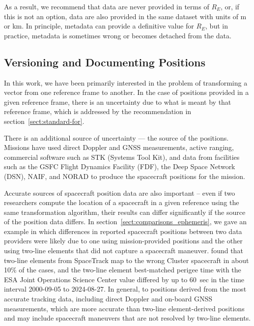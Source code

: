 \documentclass[draft]{agujournal2019}
\begin{document}
As a result, we recommend that data are never provided in terms of $R_E$, or, if this is not an option, data are also provided in the same dataset with units of m or km. In principle, metadata can provide a definitive value for $R_E$, but in practice, metadata is sometimes wrong or becomes detached from the data.

\subsection{Versioning and Documenting Positions}
\label{sect:ephemeris-version}

In this work, we have been primarily interested in the problem of transforming a vector from one reference frame to another. In the case of positions provided in a given reference frame, there is an uncertainty due to what is meant by that reference frame, which is addressed by the recommendation in section~\ref{sect:standard-for}. 

There is an additional source of uncertainty --- the source of the positions. Missions have used direct Doppler and GNSS measurements, active ranging, commercial software such as STK (Systems Tool Kit), and data from facilities such as the GSFC Flight Dynamics Facility (FDF), the Deep Space Network (DSN), NAIF, and NORAD to produce the spacecraft positions for the mission.

Accurate sources of spacecraft position data are also important -- even if two researchers compute the location of a spacecraft in a given reference using the same transformation algorithm, their results can differ significantly if the source of the position data differs. In section~\ref{sect:comparisons_ephemeris}, we gave an example in which differences in reported spacecraft positions between two data providers were likely due to one using mission-provided positions and the other using two-line elements that did not capture a spacecraft maneuver.  found that two-line elements from SpaceTrack map to the wrong Cluster spacecraft in about 10\% of the cases, and the two-line element best-matched perigee time with the ESA Joint Operations Science Center value differed by up to 60~sec in the time interval 2000-09-05 to 2024-08-27. In general,  to positions derived from the most accurate tracking data, including direct Doppler and on-board GNSS measurements, which are more accurate than two-line element-derived positions and may include spacecraft maneuvers that are not resolved by two-line elements.
\end{document}
